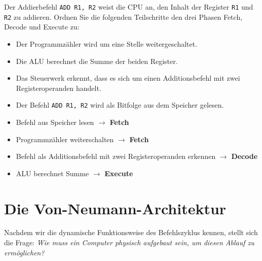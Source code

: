 \begin{mychallenge}\label{mychallenge:fde_phasen}
    Der Addierbefehl \texttt{ADD R1, R2} weist die \gls{CPU} an, den Inhalt der Register \texttt{R1} und \texttt{R2} zu addieren. Ordnen Sie die folgenden Teilschritte den drei Phasen Fetch, Decode und Execute zu:
    \begin{itemize}
        \item Der Programmzähler wird um eine Stelle weitergeschaltet.
        \item Die \gls{ALU} berechnet die Summe der beiden Register.
        \item Das Steuerwerk erkennt, dass es sich um einen Additionsbefehl mit zwei Registeroperanden handelt.
        \item Der Befehl \texttt{ADD R1, R2} wird als Bitfolge aus dem Speicher gelesen.
    \end{itemize}
    \begin{myanswer}
        \begin{itemize}
            \item Befehl aus Speicher lesen $\to$ \textbf{Fetch}
            \item Programmzähler weiterschalten $\to$ \textbf{Fetch}
            \item Befehl als Additionsbefehl mit zwei Registeroperanden erkennen $\to$ \textbf{Decode}
            \item \gls{ALU} berechnet Summe $\to$ \textbf{Execute}
        \end{itemize}
    \end{myanswer}
\end{mychallenge}

\section{Die Von-Neumann-Architektur}\label{sec:von_neumann}

Nachdem wir die dynamische Funktionsweise des Befehlszyklus kennen, stellt sich die Frage: \emph{Wie muss ein Computer physisch aufgebaut sein, um diesen Ablauf zu ermöglichen?}

